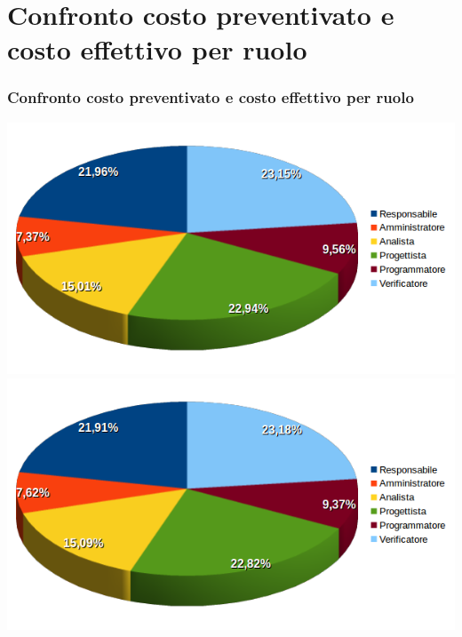 \section{Confronto costo preventivato e costo effettivo per ruolo}
\begin{frame}
	\frametitle{Confronto costo preventivato e costo effettivo per ruolo}	
	\begin{center}
		\includegraphics[scale=0.30]{img/costoEFFETTIVOperruolo.png}
		\qquad\qquad
		\includegraphics[scale=0.30]{img/costoPREVENTIVATOperruolo.png}
	\end{center}
	
	
\end{frame}


